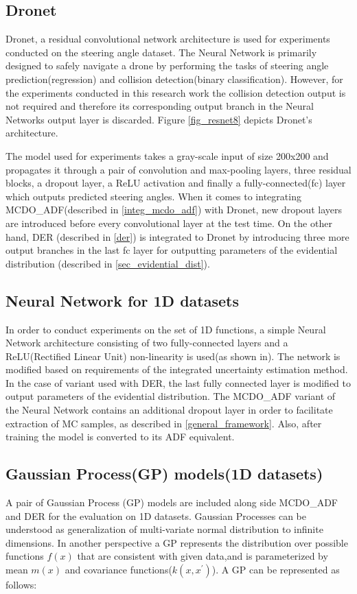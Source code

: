 \subsection{Dronet}
Dronet, a residual convolutional network architecture is used for experiments conducted on the steering angle dataset. The Neural Network is primarily designed to safely navigate a drone by performing the tasks of steering angle prediction(regression) and collision detection(binary classification). However, for the experiments conducted in this research work the collision detection output is not required and therefore its corresponding output branch in the Neural Networks output layer is discarded. Figure \ref{fig_resnet8} depicts Dronet's architecture.

The model used for experiments takes a gray-scale input of size 200x200 and propagates it through a pair of convolution and max-pooling layers, three residual blocks, a dropout layer, a ReLU activation and finally a fully-connected(fc) layer which outputs predicted steering angles. When it comes to integrating MCDO\_ADF(described in \ref{integ_mcdo_adf}) with Dronet, new dropout layers are introduced before every convolutional layer at the test time. On the other hand, DER (described in \ref{der}) is integrated to Dronet by introducing three more output branches in the last fc layer for outputting parameters of the evidential distribution (described in \ref{sec_evidential_dist}).

\subsection{Neural Network for 1D datasets}\label{1D_net}

In order to conduct experiments on the set of 1D functions, a simple Neural Network architecture consisting of two fully-connected layers and a ReLU(Rectified Linear Unit) non-linearity is used(as shown in). The network is modified based on requirements of the integrated uncertainty estimation method. In the case of variant used with DER, the last fully connected layer is modified to output parameters of the evidential distribution. The MCDO\_ADF variant of the Neural Network contains an additional dropout layer in order to facilitate extraction of MC samples, as described in \ref{general_framework}. Also, after training the model is converted to its ADF equivalent.

\subsection{Gaussian Process(GP) models(1D datasets)}
A pair of Gaussian Process (GP) models are included along side MCDO\_ADF and DER for the evaluation on 1D datasets. Gaussian Processes can be understood as generalization of multi-variate normal distribution to infinite dimensions. In another perspective a GP represents the distribution over possible functions $f(x)$ that are consistent with given data,and is parameterized by mean $m(x)$ and covariance functions($k(x, x^\prime)$). A GP can be represented as follows:


